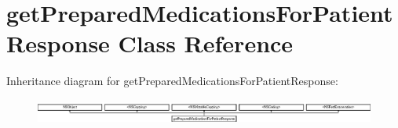 \hypertarget{interfaceget_prepared_medications_for_patient_response}{}\section{get\+Prepared\+Medications\+For\+Patient\+Response Class Reference}
\label{interfaceget_prepared_medications_for_patient_response}
Inheritance diagram for get\+Prepared\+Medications\+For\+Patient\+Response\+:\begin{figure}[H]
\begin{center}
\leavevmode
\includegraphics[height=0.826568cm]{interfaceget_prepared_medications_for_patient_response}
\end{center}
\end{figure}
